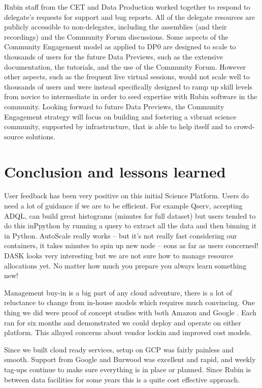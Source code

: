 Rubin staff from the CET and Data Production worked together to respond to delegate's requests for support and bug reports.
All of the delegate resources are publicly accessible to non-delegates, including the assemblies (and their recordings) and the Community Forum discussions.
Some aspects of the Community Engagement model as applied to DP0 are designed to scale to thousands of users for the future Data Previews, such as the extensive documentation, the tutorials, and the use of the Community Forum.
However other aspects, such as the frequent live virtual sessions, would not scale well to thousands of users and were instead specifically designed to ramp up skill levels from novice to intermediate in order to seed expertise with Rubin software in the community.
Looking forward to future Data Previews, the Community Engagement strategy will focus on building and fostering a vibrant science community,
supported by infrastructure, that is able to help itself and to crowd-source solutions.

\section{Conclusion and lessons learned}
User feedback has been very positive on this initial Science Platform.
Users do need a lot of guidance if we are to be efficient.
For example Qserv, accepting ADQL, can build great histograms (minutes for full dataset) but users
tended to do this inPpython by running a query to extract all the data and then binning it in Python.
AutoScale really works -- but it's not really fast considering our containers, it takes minutes to spin up new node -- eons as far as users concerned!
DASK looks very interesting but we are not sure how to manage resource allocations yet.
No matter how much you prepare you always learn something new!

Management buy-in is a big part of any cloud adventure, there is a lot of reluctance to change from in-house models
which requires much convincing. One thing we did were proof of concept studies with both Amazon \citep{2020arXiv201106044B,DMTN-137} and Google \citep{DMTN-125}. Each ran for six months and demonstrated we could deploy and operate on either platform. This allayed concerns about vendor lockin and improved cost models.

Since we built cloud ready services, setup on GCP was fairly painless and smooth.
Support from Google and Burwood was excellent and rapid, and weekly tag-ups continue to make sure everything is in place or planned.
Since Rubin is between data facilities for some years this is a quite cost effective approach.
